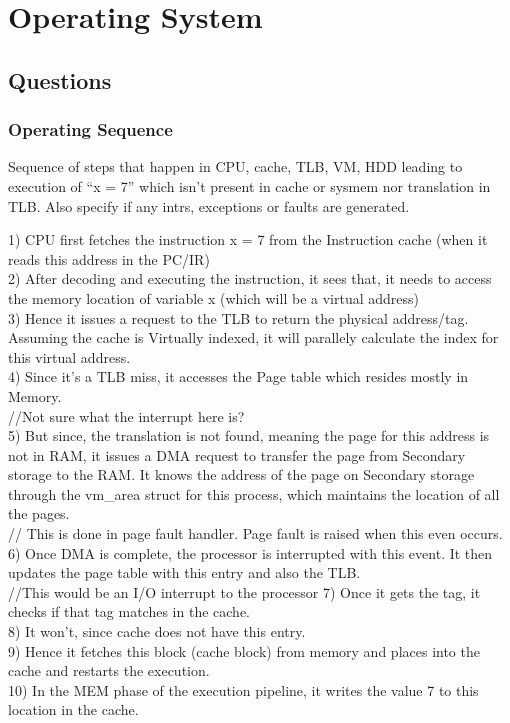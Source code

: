 \chapter{Operating System}
\section{Questions}
\subsection{Operating Sequence}
Sequence of steps that happen in CPU, cache, TLB, VM, HDD leading to execution of “x = 7” which isn’t present in cache or sysmem nor translation in TLB. Also specify if any intrs, 
exceptions or faults are generated.

1) CPU first fetches the instruction x = 7 from the Instruction cache (when it reads this address in the PC/IR) \\
2) After decoding and executing the instruction, it sees that, it needs to access the memory location of variable x (which will be a virtual address) \\
3) Hence it issues a request to the TLB to return the physical address/tag. \\
Assuming the cache is Virtually indexed, it will parallely calculate the index for this virtual address. \\
4) Since it's a TLB miss, it accesses the Page table which resides mostly in Memory. \\
//Not sure what the interrupt here is? \\
5) But since, the translation is not found, meaning the page for this address is not in RAM, it issues a DMA request to transfer the page from Secondary storage to the RAM. It 
knows the address of the page on Secondary storage through the vm_area struct for this process, which maintains the location of all the pages. \\
// This is done in page fault handler. Page fault is raised when this even occurs. \\
6) Once DMA is complete, the processor is interrupted with this event. It then updates the page table with this entry and also the TLB. \\
//This would be an I/O interrupt to the processor 
7) Once it gets the tag, it checks if that tag matches in the cache. \\
8) It won't, since cache does not have this entry. \\
9) Hence it fetches this block (cache block) from memory and places into the cache and restarts the execution. \\
10) In the MEM phase of the execution pipeline, it writes the value 7 to this location in the cache.


